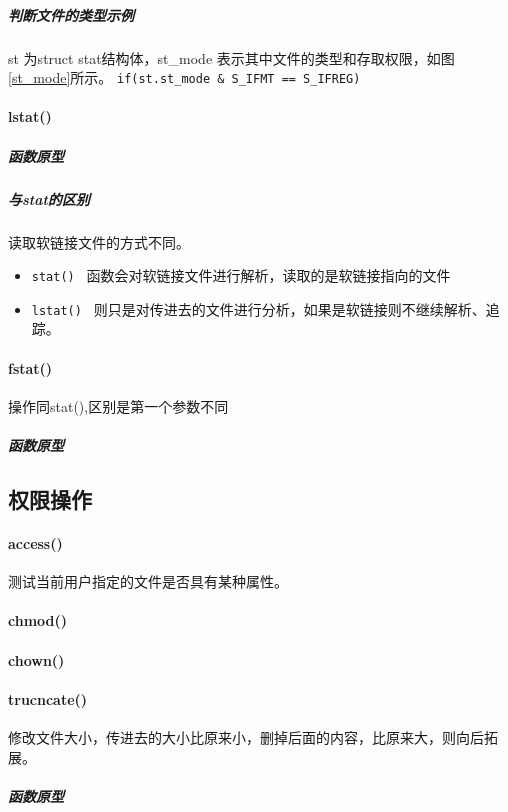 \documentclass[UTF8,a4paper,12pt]{ctexbook}
\begin{document}
			\subparagraph{判断文件的类型示例}st 为struct stat结构体，st\_mode 表示其中文件的类型和存取权限，如图\ref{st_mode}所示。
				\verb|if(st.st_mode & S_IFMT == S_IFREG)|
			
		\paragraph{lstat()}
			\subparagraph{函数原型}
			
			\subparagraph{与stat的区别}读取软链接文件的方式不同。
				\begin{itemize}[itemindent = 1em]
					\item \verb|stat() | 函数会对软链接文件进行解析，读取的是软链接指向的文件
					\item \verb|lstat() | 则只是对传进去的文件进行分析，如果是软链接则不继续解析、追踪。
				\end{itemize}
				
		\paragraph{fstat()}操作同stat(),区别是第一个参数不同
			\subparagraph{函数原型}	
			
	\subsection{权限操作}	
		\paragraph{access()} 测试当前用户指定的文件是否具有某种属性。
		
		\paragraph{chmod()}
		
		\paragraph{chown()}
		
		\paragraph{trucncate()}修改文件大小，传进去的大小比原来小，删掉后面的内容，比原来大，则向后拓展。
			\subparagraph{函数原型}
			
\end{document}
